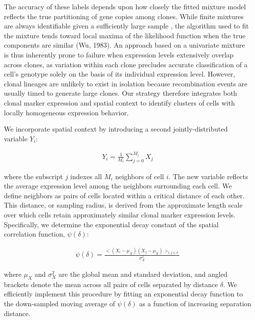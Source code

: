 \documentclass[10pt,letterpaper]{article}
\begin{document}
The accuracy of these labels depends upon how closely the fitted mixture model reflects the true partitioning of gene copies among clones. While finite mixtures are always identifiable given a sufficiently large sample \cite{Teicher1963}, the algorithm used to fit the mixture tends toward local maxima of the likelihood function when the true components are similar (Wu, 1983). An approach based on a univariate mixture is thus inherently prone to failure when expression levels extensively overlap across clones, as variation within each clone precludes accurate classification of a cell's genotype solely on the basis of its individual expression level. However, clonal lineages are unlikely to exist in isolation because recombination events are usually timed to generate large clones. Our strategy therefore integrates both clonal marker expression and spatial context to identify clusters of cells with locally homogeneous expression behavior.

We incorporate spatial context by introducing a second jointly-distributed variable $Y_i$:
\begin{linenomath} \begin{gather}
Y_i = \frac{1}{M_i} \sum^{M_i}_{j=0} X_j
\end{gather} \end{linenomath}
where the subscript $j$ indexes all $M_i$ neighbors of cell $i$. The new variable reflects the average expression level among the neighbors surrounding each cell. We define neighbors as pairs of cells located within a critical distance of each other. This distance, or sampling radius, is derived from the approximate length scale over which cells retain approximately similar clonal marker expression levels. Specifically, we determine the exponential decay constant of the spatial correlation function, $\psi (\delta)$:
\begin{linenomath} \begin{gather}
\psi(\delta) = \frac {<( X_i -\mu_{X})( X_j -\mu_{X})>_{i,j \in \delta}} {\sigma_X^2}
\end{gather} \end{linenomath}
where $\mu_X$ and $\sigma_X^2$ are the global mean and standard deviation, and angled brackets denote the mean across all pairs of cells separated by distance $\delta$. We efficiently implement this procedure by fitting an exponential decay function to the down-sampled moving average of $\psi (\delta)$ as a function of increasing separation distance.
\end{document}
